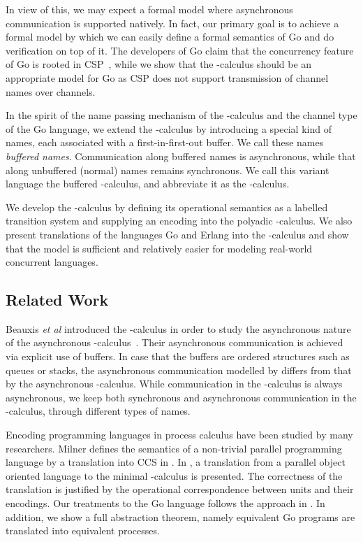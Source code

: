\documentclass[runningheads, envcountsame, a4paper]{llncs}
\begin{document}
In view of this, we may expect a formal model where asynchronous communication is supported natively.
In fact, our primary goal is to achieve a formal model by which we can easily define a formal semantics of Go
and do verification on top of it.
The developers of Go claim that the concurrency feature of Go is rooted in CSP~\cite{Hoare1978},
while we show that the -calculus should be an appropriate model for Go
as CSP does not support transmission of channel names over channels.

In the spirit of the name passing mechanism of the -calculus and the channel type of the Go language,
we extend the -calculus by introducing a special kind of names, each associated with a first-in-first-out buffer.
We call these names {\em buffered names}. Communication along buffered names is asynchronous,
while that along unbuffered (normal) names remains synchronous.
We call this variant language the buffered -calculus, and abbreviate it as the -calculus.

We develop the -calculus by defining its operational semantics as a labelled transition system and
supplying an encoding into the polyadic -calculus.
We also present translations of the languages Go and Erlang into the -calculus
and show that the model is sufficient and relatively easier for modeling real-world concurrent languages.

\subsection{Related Work}

Beauxis \emph{et al} introduced the -calculus in order to
study the asynchronous nature of the asynchronous -calculus~\cite{Beauxis2008}.
Their asynchronous communication is achieved via explicit use of buffers.
In case that the buffers are ordered structures such as queues or stacks, the asynchronous communication
modelled by  differs from that by the asynchronous -calculus.
While communication in the -calculus is always asynchronous,
we keep both synchronous and asynchronous communication in the -calculus, through different types of names.

Encoding programming languages in process calculus have been studied by many researchers.
Milner defines the semantics of a non-trivial parallel programming language by a translation into CCS in \cite{Milner1989}.
In \cite{Walker1995}, a translation from a parallel object oriented language to the minimal -calculus is presented.
The correctness of the translation is justified by the operational correspondence between units and their encodings.
Our treatments to the Go language follows the approach in \cite{Walker1995}.
In addition, we show a full abstraction theorem, namely equivalent Go programs are translated into equivalent  processes.
\end{document}
